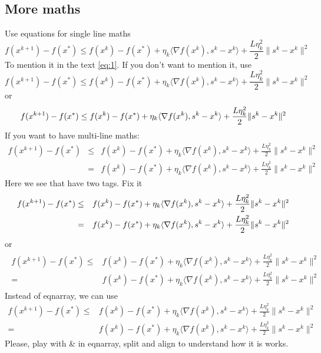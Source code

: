 \documentclass{article}
\begin{document}
\subsection{More maths}

Use equations for single line maths
\begin{equation}
    \label{eq:1}
    f(x^{k+1}) - f(x^*) 
    \leq
    f(x^k) - f(x^*) + \eta_k \langle\nabla f(x^k), s^{k} - x^k \rangle + \frac{L \eta_k^2}{2} \|s^{k} - x^k \|^2
\end{equation}
To mention it in the text \eqref{eq:1}. If you don't want to mention it, use 
\begin{equation*}
    f(x^{k+1}) - f(x^*) 
    \leq
    f(x^k) - f(x^*) + \eta_k \langle\nabla f(x^k), s^{k} - x^k \rangle + \frac{L \eta_k^2}{2} \|s^{k} - x^k \|^2
\end{equation*}
or 
\begin{equation}
    f(x^{k+1}) - f(x^*) 
    \leq
    f(x^k) - f(x^*) + \eta_k \langle\nabla f(x^k), s^{k} - x^k \rangle + \frac{L \eta_k^2}{2} \|s^{k} - x^k \|^2 \notag
\end{equation}
If you want to have multi-line maths:
\begin{eqnarray}
    f(x^{k+1}) - f(x^*) 
    &\leq&
    f(x^k) - f(x^*) + \eta_k \langle\nabla f(x^k), s^{k} - x^k \rangle + \frac{L \eta_k^2}{2} \|s^{k} - x^k \|^2
    \\&=&
    f(x^k) - f(x^*) + \eta_k \langle\nabla f(x^k), s^{k} - x^k \rangle + \frac{L \eta_k^2}{2} \|s^{k} - x^k \|^2
\end{eqnarray}
Here we see that have two tags. Fix it
\begin{eqnarray}
    f(x^{k+1}) - f(x^*) 
    &\leq&
    f(x^k) - f(x^*) + \eta_k \langle\nabla f(x^k), s^{k} - x^k \rangle + \frac{L \eta_k^2}{2} \|s^{k} - x^k \|^2
    \notag\\&=&
    f(x^k) - f(x^*) + \eta_k \langle\nabla f(x^k), s^{k} - x^k \rangle + \frac{L \eta_k^2}{2} \|s^{k} - x^k \|^2
\end{eqnarray}
or
\begin{eqnarray}
    \begin{split}
        f(x^{k+1}) - f(x^*) 
        \leq&
        f(x^k) - f(x^*) + \eta_k \langle\nabla f(x^k), s^{k} - x^k \rangle + \frac{L \eta_k^2}{2} \|s^{k} - x^k \|^2
        \\=&
        f(x^k) - f(x^*) + \eta_k \langle\nabla f(x^k), s^{k} - x^k \rangle + \frac{L \eta_k^2}{2} \|s^{k} - x^k \|^2
    \end{split}
\end{eqnarray}
Instead of eqnarray, we can use
\begin{align*}
    f(x^{k+1}) - f(x^*) 
    \leq&
    f(x^k) - f(x^*) + \eta_k \langle\nabla f(x^k), s^{k} - x^k \rangle + \frac{L \eta_k^2}{2} \|s^{k} - x^k \|^2
    \\=&
    f(x^k) - f(x^*) + \eta_k \langle\nabla f(x^k), s^{k} - x^k \rangle + \frac{L \eta_k^2}{2} \|s^{k} - x^k \|^2
\end{align*}
Please, play with \& in eqnarray, split and align to understand how it is works.
\end{document}
